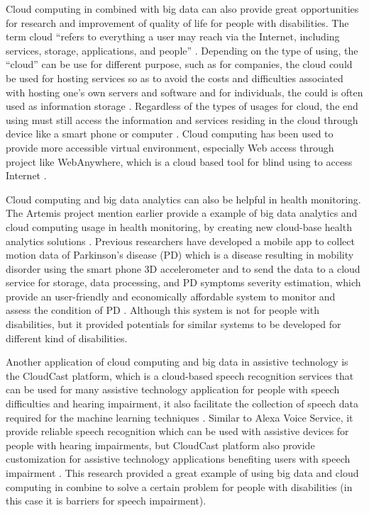 \documentclass[sigconf]{acmart}
\begin{document}
Cloud computing in combined with big data can also provide great opportunities for research and improvement of
quality of life for people with disabilities. The term cloud ``refers to everything a user may reach via the 
Internet, including services, storage, applications, and people'' \cite{Hoehl2010}. Depending on the type of 
using, the ``cloud'' can be use for different purpose, such as for companies, the cloud could be used for hosting
services so as to avoid the costs and difficulties associated with hosting one’s own servers and software and for
individuals, the could is often used as information storage \cite{Khazaei14}. Regardless of the types of usages 
for cloud, the end using must still access the information and services residing in the cloud through device like
a smart phone or computer \cite{Hoehl2010}. Cloud computing has been used to provide more accessible virtual 
environment, especially Web access through project like WebAnywhere, which is a cloud based tool for blind using 
to access Internet \cite{Hoehl2010}. 

Cloud computing and big data analytics can also be helpful in health monitoring. The Artemis project mention earlier
provide a example of big data analytics and cloud computing usage in health monitoring, by creating new cloud-base
health analytics solutions \cite{Khazaei14}. Previous researchers have developed a mobile app to collect motion 
data of Parkinson's disease (PD) which is a disease resulting in mobility disorder using the smart phone 3D 
accelerometer and to send the data to a cloud service for storage, data processing, and PD symptoms severity
estimation, which provide an user-friendly and economically affordable system to monitor and assess the condition
of PD \cite{info:doi/10.2196/mhealth.3956}. Although this system is not for people with disabilities, but it 
provided potentials for similar systems to be developed for different kind of disabilities. 

Another application of cloud computing and big data in assistive technology is the CloudCast platform, which is a 
cloud-based speech recognition services that can be used for many assistive technology application for people
with speech difficulties and hearing impairment, it also facilitate the collection of speech data required for
the machine learning techniques \cite{cunningham2017cloud}. Similar to Alexa Voice Service, it provide reliable 
speech recognition which can be used with assistive devices for people with hearing impairments, but CloudCast
platform also provide customization for assistive technology applications benefiting users with speech 
impairment \cite{cunningham2017cloud}. This research provided a great example of using big data and cloud 
computing in combine to solve a certain problem for people with disabilities (in this case it is barriers for speech impairment). 
\end{document}
